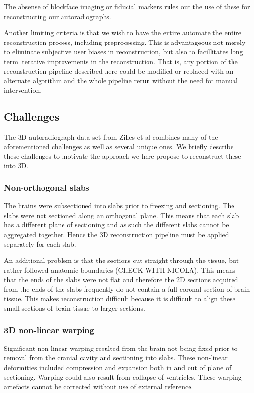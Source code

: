 \documentclass[12pt]{article}
\begin{document}
The absense of blockface imaging or fiducial markers rules out the use of these for reconstructing our autoradiographs.

Another limiting criteria is that we wish to have the entire automate the entire reconstruction process, including preprocessing. This is advantageous not merely to eliminate subjective user biases in reconstruction, but also to facillitates long term iterative improvements in the reconstruction. That is, any portion of the reconstruction pipeline described here could be modified or replaced with an alternate algorithm and the whole pipeline rerun without the need for manual intervention.


\subsection{Challenges}

The 3D autoradiograph data set from Zilles et al \cite{Zilles2002} combines many of the aforementioned challenges as well as several unique ones. We briefly describe these challenges to motivate the approach we here propose to reconstruct these into 3D. 

\subsubsection{Non-orthogonal slabs}

The brains were subsectioned into slabs prior to freezing and sectioning. The slabs were not sectioned along an orthogonal plane. This means that each slab has a different plane of sectioning and as such the different slabs cannot be aggregated together. Hence the 3D reconstruction pipeline must be applied separately for each slab. 

An additional problem is that the sections cut straight through the tissue, but rather followed anatomic boundaries (CHECK WITH NICOLA). This means that the ends of the slabs were not flat and therefore the 2D sections acquired from the ends of the slabs frequently do not contain a full coronal section of brain tissue. This makes reconstruction difficult because it is difficult to align these small sections of brain tissue to larger sections. 

\subsubsection{3D non-linear warping}

Significant non-linear warping resulted from the brain not being fixed prior to removal from the cranial cavity and sectioning into slabs. These non-linear deformities included compression and expansion both in and out of plane of sectioning. Warping could also result from collapse of ventricles. These warping artefacts cannot be corrected without use of external reference. 
\end{document}
